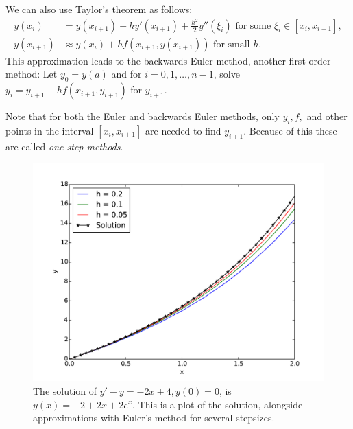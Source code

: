 We can also use Taylor's theorem as follows: 
\begin{align*}
y(x_{i}) &= y(x_{i+1}) - h y'(x_{i+1}) + \frac{h^2}{2} y''(\xi_i) \text{ for some } \xi_i \in [x_i,x_{i+1}], \\
y(x_{i+1}) &\approx  y(x_{i}) + h f(x_{i+1},y(x_{i+1}))  \text{ for small } h .
\end{align*}
This approximation leads to the backwards Euler method, another first order method: Let $y_0 = y(a)$ and for $i = 0, 1, \hdots, n-1$, solve  $y_{i} = y_{i+1}-hf(x_{i+1},y_{i+1})$ for $y_{i+1}$.

Note that for both the Euler and backwards Euler methods, only $y_i, f, $ and other points in the interval $[x_i, x_{i+1}]$ are needed to find $y_{i+1}$. Because of this these are called \textit{one-step methods}. 


\begin{figure}[ht]
\centering
\includegraphics[width=\textwidth]{Fig1.pdf}
\caption{The solution of $y' -y= -2x+4, y(0) = 0$, is $y(x) = -2+2x + 2e^x.$ This is a plot of the solution, alongside approximations with Euler's method for several stepsizes.}
\label{ivp:euler}
\end{figure}


